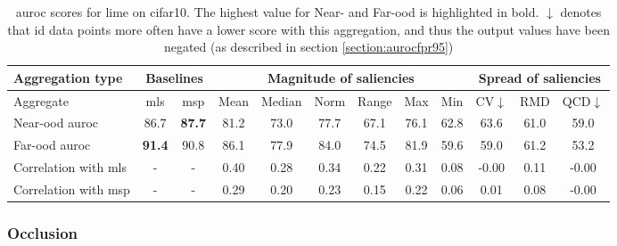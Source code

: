 \documentclass[UKenglish]{uiomasterthesis} %
\theoremstyle{definition}
\begin{document}
\begin{table}[H]
\setlength\tabcolsep{4pt}
\begin{center}
\begin{tabular}{ |m{5em}|c c|c c c c c c|c c c| }
    \hline
     Aggregation type & \multicolumn{2}{c|}{Baselines} & \multicolumn{6}{c|}{Magnitude of saliencies} & \multicolumn{3}{c|}{Spread of saliencies} \\
    \hline
    Aggregate & \ac{mls} & \ac{msp} & Mean & Median & Norm & Range & Max & Min & CV$\downarrow$ & RMD & QCD$\downarrow$  \\
    \hline
    \rowcolor{near!50}
    Near-\ac{ood} \ac{auroc} & 86.7 &\textbf{ 87.7 }& 81.2 & 73.0 & 77.7 & 67.1 & 76.1 & 62.8 & 63.6 & 61.0 & 59.0  \\
    \hline
    \rowcolor{far!50}
    Far-\ac{ood} \ac{auroc} &\textbf{ 91.4 }& 90.8 & 86.1 & 77.9 & 84.0 & 74.5 & 81.9 & 59.6 & 59.0 & 61.2 & 53.2  \\
    \hline
    Correlation with \ac{mls}& - & - & 0.40 & 0.28 & 0.34 & 0.22 & 0.31 & 0.08 & -0.00 & 0.11 & -0.00  \\
    \hline
    Correlation with \ac{msp}& - & - & 0.29 & 0.20 & 0.23 & 0.15 & 0.22 & 0.06 & 0.01 & 0.08 & -0.00  \\
    \hline
    \end{tabular}
    \caption{\ac{auroc} scores for lime on cifar10. The highest value for Near- and Far-\ac{ood} is highlighted in bold. $\downarrow$ denotes that \ac{id} data points more often have a lower score with this aggregation, and thus the output values have been negated (as described in section \ref{section:aurocfpr95})}
    \label{table:cifar10_lime_metrics}
\end{center}
\setlength\tabcolsep{6pt}
\end{table}

\subsubsection{Occlusion}
\end{document}
